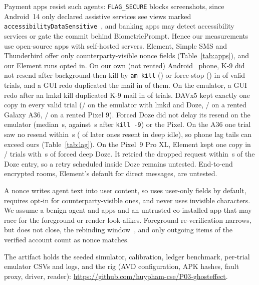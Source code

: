 Payment apps resist such agents: \texttt{FLAG\_SECURE} blocks screenshots, since Android~14 only declared assistive services see views marked \texttt{accessibility\-Data\-Sensitive}~\cite{android_a11ysensitive,googleplay_a11ypolicy},
and banking apps may detect accessibility services or gate the commit behind BiometricPrompt. Hence our measurements use open-source apps with self-hosted servers. Element, Simple SMS and Thunderbird offer only counterparty-visible nonce fields (Table~\ref{tab:apps}), and our Element runs opted in. On our own (not rented) Android~\RealPhoneAndroid{} phone, K-9 did not resend after background-then-kill by \texttt{am kill} (\RealPhoneBgN) or force-stop (\RealPhoneForceN) in \RealPhoneNoResendN{} of \RealPhoneN{} valid trials, and a GUI redo duplicated the mail in \RealPhoneDupN{} of them.
On the emulator, a GUI redo after an lmkd kill duplicated K-9 mail in \RealEmuKDupN{} of \RealEmuKN{} trials. DAVx5 kept exactly one copy in every valid trial (\RealEmuCalOnceN/\RealEmuCalValidN{} on the emulator with lmkd and Doze,
\RealRentSamOnceN/\RealRentSamValidN{} on a rented Galaxy A36, \RealRentPixOnceN/\RealRentPixValidN{} on a rented Pixel 9). Forced Doze did not delay its resend on the emulator (median
\RealEmuCalDozeMedS\,s, against \RealEmuCalKillMedS\,s after \texttt{kill -9}) or the Pixel. On the A36 one trial saw no resend within
\RealRentSamDozeQuietS\,s (\RealRentSamTwoN{} of \RealRentSamTwoN{} later ones resent in deep idle), so phone lag tails can exceed ours (Table~\ref{tab:lag}). On the Pixel~9 Pro XL, Element kept one copy in \PixDozeOnce/\PixDozeN{} trials with \PixDozeS\,s of forced deep Doze.
It retried the dropped request within \PixDozeRetryS\,s of the Doze entry, so a retry scheduled inside Doze remains untested. End-to-end encrypted rooms, Element's default for direct messages, are untested.

A nonce writes agent text into user content, so \sys uses user-only fields by default, requires opt-in for counterparty-visible ones, and never uses invisible characters. We assume
a benign agent and apps and an untrusted co-installed app that may race for the foreground or render look-alikes. Foreground re-verification narrows, but does not close, the
rebinding window~\cite{qian2026rebinding}, and only outgoing items of the verified account count as nonce matches.

The artifact holds the seeded simulator, calibration, ledger benchmark, per-trial emulator CSVs and logs,
and the rig (AVD configuration, APK hashes, fault proxy, driver, reader): \url{https://github.com/huypham-cse/P03-ghosteffect}.
